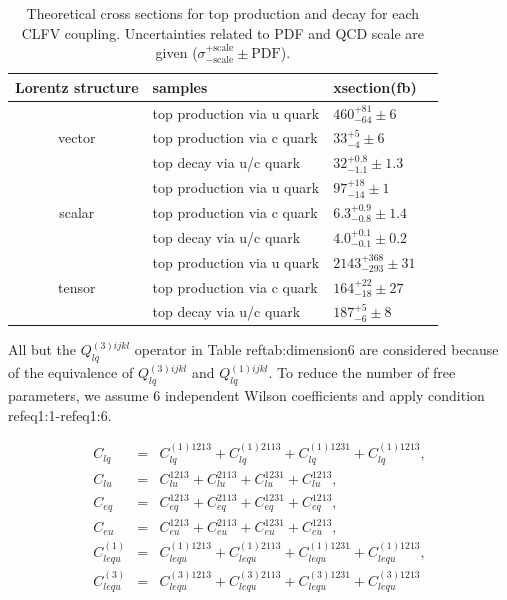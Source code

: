 \begin{table}[th]
\centering
\caption{Theoretical cross sections for top production and decay for each CLFV coupling. Uncertainties related to PDF and QCD scale are given ($\sigma^{+\text{scale}}_{-\text{scale}}\pm \text{PDF}$).}
\begin{tabular}{clll}
\toprule 
Lorentz structure    & samples              & xsection(fb)   \\  \midrule
\multirow{3}{*}{vector} & top production via u quark  & $460^{+81}_{-64}\pm6$ \\ 
      &  top production via c quark & $33^{+5}_{-4}\pm6$    \\
      & top decay via u/c quark        & $32^{+0.8}_{-1.1}\pm1.3$   \\  \midrule
\multirow{3}{*}{scalar} &top production via u quark  & $97^{+18}_{-14}\pm1$  \\ 
      & top production via c quark       & $6.3^{+0.9}_{-0.8}\pm1.4$  \\
      &  top decay via u/c quark    &  $4.0^{+0.1}_{-0.1}\pm0.2$  \\  \midrule 
\multirow{3}{*}{tensor} &  top production via u quark & $2143^{+368}_{-293}\pm31$  \\
      &  top production via c quark & $164^{+22}_{-18}\pm27$   \\
      &  top decay via u/c quark     & $187^{+5}_{-6}\pm8$   \\  \bottomrule
\end{tabular}
\vspace{-0.5em}
\label{tab:signal}
\end{table}

All but the $Q_{lq}^{(3)ijkl}$ operator in Table ref{tab:dimension6} are considered because of the equivalence of $Q_{lq}^{(3)ijkl}$ and $Q_{lq}^{(1)ijkl}$. To reduce the number of free parameters, we assume 6 independent Wilson coefficients and apply condition ref{eq1:1}-ref{eq1:6}. 

\begin{eqnarray}
\label{eq1:1}
 C_{lq}
 &=& C_{lq}^{(1)1213}
 + C_{lq}^{(1)2113}
 + C_{lq}^{(1)1231}
 + C_{lq}^{(1)1213}
 ,\\
\label{eq1:2}
 C_{lu}  
 &=& C_{lu}^{1213}
 + C_{lu}^{2113}
 + C_{lu}^{1231}
 + C_{lu}^{1213}
 ,\\ 
\label{eq1:3}
 C_{eq}
 &=& C_{eq}^{1213}
 + C_{eq}^{2113}
 + C_{eq}^{1231}
 + C_{eq}^{1213}
 ,\\
\label{eq1:4}
 C_{eu}  
 &=& C_{eu}^{1213}
 + C_{eu}^{2113}
 + C_{eu}^{1231}
 + C_{eu}^{1213}
 ,\\
\label{eq1:5}
 C_{lequ}^{(1)}  
 &=& C_{lequ}^{(1)1213}
 + C_{lequ}^{(1)2113}
 + C_{lequ}^{(1)1231}
 + C_{lequ}^{(1)1213}
  ,\\
\label{eq1:6}
 C_{lequ}^{(3)}
 &=& C_{lequ}^{(3)1213}
 + C_{lequ}^{(3)2113}
 + C_{lequ}^{(3)1231}
 + C_{lequ}^{(3)1213} 
\end{eqnarray}

